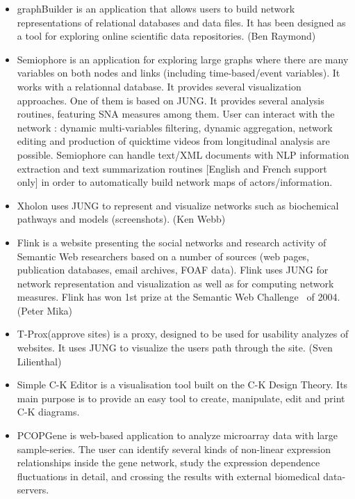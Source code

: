 \begin{enumerate}
\begin{itemize}
\item graphBuilder is an application that allows users to build network representations of relational databases and data files. It has been designed as a tool for exploring online scientific data repositories. (Ben Raymond)~\cite{GRAPHBUILDER}

\item Semiophore is an application for exploring large graphs where there are many variables on both nodes and links (including time-based/event variables). It works with a relationnal database. It provides several visualization approaches. One of them is based on JUNG. It provides several analysis routines, featuring SNA measures among them. User can interact with the network : dynamic multi-variables filtering, dynamic aggregation, network editing and production of quicktime videos from longitudinal analysis are possible. Semiophore can handle text/XML documents with NLP information extraction and text summarization routines [English and French support only] in order to automatically build network maps of actors/information.~\cite{SEMIOPHORE}

\item Xholon uses JUNG to represent and visualize networks such as biochemical pathways and models (screenshots). (Ken Webb)~\cite{XHOLON}

\item Flink is a website presenting the social networks and research activity of Semantic Web researchers based on a number of sources (web pages, publication databases, email archives, FOAF data). Flink uses JUNG for network representation and visualization as well as for computing network measures. Flink has won 1st prize at the Semantic Web Challenge~\cite{SWC} of 2004. (Peter Mika)~\cite{FLINK}

\item T-Prox(approve sites) is a proxy, designed to be used for usability analyzes of websites. It uses JUNG to visualize the users path through the site. (Sven Lilienthal)~\cite{T_PROX}

\item Simple C-K Editor is a visualisation tool built on the C-K Design Theory. Its main purpose is to provide an easy tool to create, manipulate, edit and print C-K diagrams.~\cite{SIMPLE_C_K_EDITOR}

\item PCOPGene is web-based application to analyze microarray data with large sample-series. The user can identify several kinds of non-linear expression relationships inside the gene network, study the expression dependence fluctuations in detail, and crossing the results with external biomedical data-servers.~\cite{PCOPGENE}

\end{itemize}

\end{enumerate}

